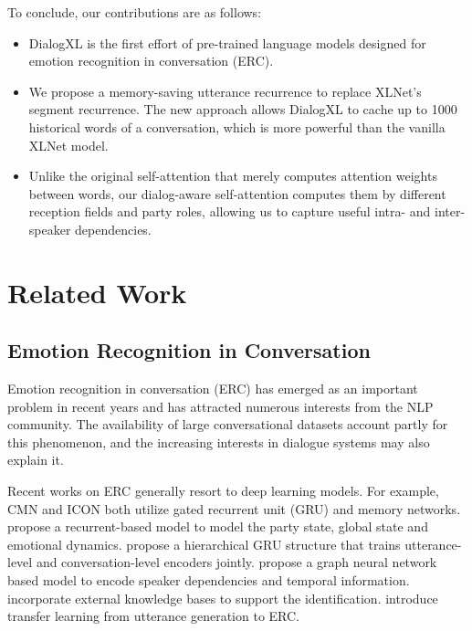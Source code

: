 \documentclass[letterpaper]{article} \usepackage{aaai21}  \usepackage{times}  \usepackage{helvet} \usepackage{courier}  \usepackage[hyphens]{url}  \usepackage{graphicx} \usepackage{amstext}
\begin{document}
To conclude, our contributions are as follows:
\begin{itemize}
\item DialogXL is the first effort of pre-trained language models designed for emotion recognition in conversation (ERC).


\item We propose a memory-saving utterance recurrence to replace XLNet's segment recurrence. The new approach allows DialogXL to cache up to 1000 historical words of a conversation, which is more powerful than the vanilla XLNet model.

\item  Unlike the original self-attention that merely computes attention weights between words, our dialog-aware self-attention computes them by different reception fields and party roles, allowing us to capture  useful intra- and inter-speaker dependencies.
\end{itemize}

\section{Related Work}
\subsection{Emotion Recognition in Conversation}
Emotion recognition in conversation (ERC) has emerged as an important problem in recent years and has attracted numerous interests from the NLP community. The availability of large conversational datasets \cite{busso2008iemocap, schuller2012avec, li2017dailydialog, chen2018emotionlines, poria2019meld} account partly for this phenomenon, and the increasing interests in dialogue systems may also explain it. 

Recent works on ERC generally resort to deep learning models. For example, CMN \cite{hazarika2018conversational} and ICON \cite{hazarika2018icon} both utilize gated recurrent unit (GRU) and memory networks. \citeauthor{majumder2019dialoguernn}  propose a recurrent-based model to model the party state, global state and emotional dynamics. \citeauthor{jiao2019higru}  propose a hierarchical GRU structure that trains utterance-level and conversation-level encoders jointly. \citeauthor{ghosal2019dialoguegcn}  propose a graph neural network based model to encode speaker dependencies and temporal information. \citeauthor{zhong2019knowledge}   incorporate external knowledge bases to support the identification. \citeauthor{hazarika2019emotion}  introduce transfer learning from utterance generation to ERC.
\end{document}
